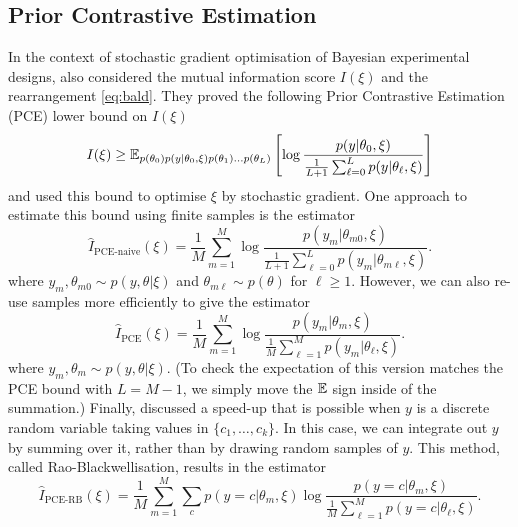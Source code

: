 \documentclass[a4paper, 10pt]{report}
\theoremstyle{plain}
\begin{document}
	\subsection{Prior Contrastive Estimation}
	In the context of stochastic gradient optimisation of Bayesian experimental designs, \citet{foster2020unified} also considered the mutual information score $I(\xi)$ and the rearrangement \eqref{eq:bald}.
	They proved the following Prior Contrastive Estimation (PCE) lower bound on $I(\xi)$
	\begin{equation}
	I(\xi) \ge \mathbb{E}_{p(\theta_0)p(y|\theta_0,\xi)p(\theta_1)\dots p(\theta_L)}\left[ \log \frac{p(y|\theta_0,\xi)}{\frac{1}{L+1} \sum_{\ell=0}^L p(y|\theta_\ell,\xi)} \right]
	\end{equation}
	and used this bound to optimise $\xi$ by stochastic gradient.
	One approach to estimate this bound using finite samples is the estimator
	\begin{equation}
	\hat{I}_\text{PCE-naive}(\xi) = \frac{1}{M} \sum_{m=1}^M \log \frac{p(y_m|\theta_{m0},\xi)}{\frac{1}{L+1}\sum_{\ell=0}^L p(y_m|\theta_{m\ell},\xi)  }.
	\end{equation}
	where $y_m,\theta_{m0}\sim p(y,\theta|\xi)$ and $\theta_{m\ell}\sim p(\theta)$ for $\ell \ge 1$.
	However, we can also re-use samples more efficiently to give the estimator
	\begin{equation}
	\label{eq:pce}
	\hat{I}_\text{PCE}(\xi) = \frac{1}{M} \sum_{m=1}^M \log \frac{p(y_m|\theta_{m},\xi)}{\frac{1}{M}\sum_{\ell=1}^M p(y_m|\theta_{\ell},\xi)  }.
	\end{equation}
	where $y_m,\theta_m \sim p(y,\theta|\xi)$. (To check the expectation of this version matches the PCE bound with $L=M-1$, we simply move the $\mathbb{E}$ sign inside of the summation.)
	Finally, \citet{foster2020unified} discussed a speed-up that is possible when $y$ is a discrete random variable taking values in $\{ c_1,\dots,c_k \}$.
	In this case, we can integrate out $y$ by summing over it, rather than by drawing random samples of $y$.
	This method, called Rao-Blackwellisation, results in the estimator
	\begin{equation}
	\hat{I}_\text{PCE-RB}(\xi) = \frac{1}{M} \sum_{m=1}^M \sum_c p(y=c|\theta_m,\xi) \log \frac{p(y=c|\theta_{m},\xi)}{\frac{1}{M}\sum_{\ell=1}^M p(y=c|\theta_{\ell},\xi)  }.
	\end{equation}
	
\end{document}
